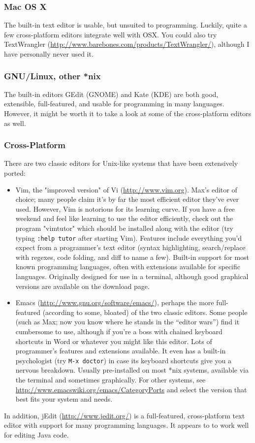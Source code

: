 \documentclass[12pt]{article}
\begin{document}
\subsubsection{Mac OS X}
The built-in text editor is usable, but unsuited to programming. Luckily, quite a few cross-platform editors integrate well with OSX. You could also try TextWrangler (\url{http://www.barebones.com/products/TextWrangler/}), although I have personally never used it.
\subsubsection{GNU/Linux, other *nix}
The built-in editors GEdit (GNOME) and Kate (KDE) are both good, extensible, full-featured, and usable for programming in many languages. However, it might be worth it to take a look at some of the cross-platform editors as well.
\subsubsection{Cross-Platform}
There are two classic editors for Unix-like systems that have been extensively ported: 
\begin{itemize}
    \item Vim, the "improved version" of Vi (\url{http://www.vim.org}). Max's editor of choice; many people claim it's by far the most efficient editor they've ever used. However, Vim is notorious for its learning curve. If you have a free weekend and feel like learning to use the editor efficiently, check out the program "vimtutor" which should be installed along with the editor (try typing \texttt{:help tutor} after starting Vim). Features include everything you'd expect from a programmer's text editor (syntax highlighting, search/replace with regexes, code folding, and diff to name a few). Built-in support for most known programming languages, often with extensions available for specific languages. Originally designed for use in a terminal, although good graphical versions are available on the download page.
    \item Emacs (\url{http://www.gnu.org/software/emacs/}), perhaps the more full-featured (according to some, bloated) of the two classic editors. Some people (such as Max; now you know where he stands in the ``editor wars'') find it cumbersome to use, although if you're a boss with chained keyboard shortcuts in Word or whatever you might like this editor. Lots of programmer's features and extensions available. It even has a built-in psychologist (try \texttt{M-x doctor}) in case its keyboard shortcuts give you a nervous breakdown. Usually pre-installed on most *nix systems, available via the terminal and sometimes graphically. For other systems, see \url{http://www.emacswiki.org/emacs/CategoryPorts} and select the version that best fits your system and needs.
\end{itemize}
In addition, jEdit (\url{http://www.jedit.org/}) is a full-featured, cross-platform text editor with support for many programming languages. It appears to to work well for editing Java code.
\end{document}
